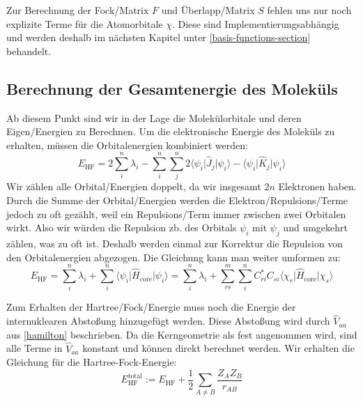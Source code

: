Zur Berechnung der Fock\-/Matrix $F$ und Überlapp\-/Matrix $S$
fehlen uns nur noch explizite Terme für die Atomorbitale $\chi$.
Diese sind Implementierungsabhängig und werden deshalb im nächsten Kapitel
unter \cref{basis-functions-section} behandelt.

\subsection{Berechnung der Gesamtenergie des Moleküls}
Ab diesem Punkt sind wir in der Lage die Molekülorbitale und
deren Eigen\-/Energien zu Berechnen. Um die elektronische Energie des Moleküls zu erhalten,
müssen die Orbitalenergien kombiniert werden:
\begin{equation}
    E_{\text{HF}} = 2 \sum_i^n \lambda_i - \sum_i^n \sum_j^n
    2 \langle \psi_i \vert \hat{J}_j \vert \psi_i \rangle
    - \langle \psi_i \vert \hat{K}_j \vert \psi_i \rangle
\end{equation}
Wir zählen alle Orbital\-/Energien doppelt, da wir insgesamt $2n$ Elektronen haben.
Durch die Summe der Orbital\-/Energien werden die Elektron\-/Repulsions\-/Terme
jedoch zu oft gezählt, weil ein Repulsions\-/Term immer zwischen zwei Orbitalen wirkt.
Also wir würden die Repulsion zb. des Orbitals $\psi_i$ mit $\psi_j$ und umgekehrt zählen,
was zu oft ist.
Deshalb werden einmal zur Korrektur die Repulsion von den Orbitalenergien abgezogen.
Die Gleichung kann man weiter umformen zu:
\begin{equation}
    E_{\text{HF}} = \sum_i^n \lambda_i
    + \sum_i^n \langle \psi_i \vert \hat{H}_{\text{core}} \vert \psi_i \rangle
    = \sum_i^n \lambda_i
    + \sum_{rs}^m \sum_i^{n} C_{ri}^*C_{si}
    \langle \chi_r \vert \hat{H}_{\text{core}} \vert \chi_s \rangle
\end{equation}

Zum Erhalten der Hartree\-/Fock\-/Energie muss noch die Energie
der internuklearen Abstoßung hinzugefügt werden.
Diese Abstoßung wird durch $\hat{V}_{aa}$ aus \cref*{hamilton} beschrieben.
Da die Kerngeometrie als fest angenommen wird, sind alle Terme in $\hat{V}_{aa}$ konstant
und können direkt berechnet werden. Wir erhalten die Gleichung für die Hartree-Fock-Energie:
\begin{equation}
    E_{\text{HF}}^{\text{total}} := E_{\text{HF}} + \frac{1}{2}\sum_{A \neq B } \frac{Z_A Z_B}{r_{AB}}
\end{equation}

\cite[S. 229-231]{lewars_2016}



